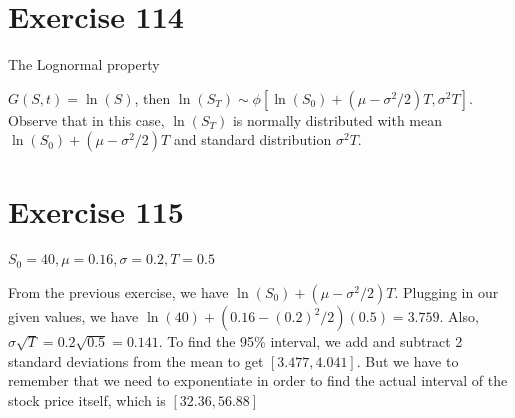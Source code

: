 \documentclass{article}
\begin{document}
\section*{Exercise 114}
The Lognormal property
\begin{flushleft}
    $G(S,t) = \ln(S)$, then $\ln(S_T) \sim \phi[\ln(S_0) + (\mu - \sigma^2/2)T, \sigma^2T]$.
    Observe that in this case, $\ln(S_T)$ is normally distributed with mean $\ln(S_0) + (\mu - \sigma^2/2)T$ and standard distribution $\sigma^2T$.
\end{flushleft}

\section*{Exercise 115}
$S_0 = 40, \mu = 0.16, \sigma = 0.2, T = 0.5$
\begin{flushleft}
    From the previous exercise, we have $\ln(S_0) + (\mu - \sigma^2/2)T$. Plugging in our given values, we have $\ln(40) + (0.16 - (0.2)^2/2)(0.5) = 3.759$.
    Also, $\sigma \sqrt{T} = 0.2\sqrt{0.5} = 0.141$. To find the 95\% interval, we add and subtract 2 standard deviations from the mean to get $[3.477, 4.041]$. But we have to remember that we need to exponentiate in order to find the actual interval
    of the stock price itself, which is $[32.36, 56.88]$
\end{flushleft}
\end{document}
